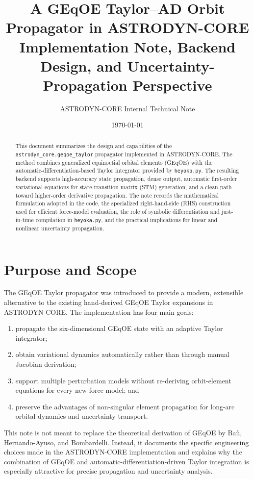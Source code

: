 \documentclass[11pt]{article}
\title{A GEqOE Taylor--AD Orbit Propagator in ASTRODYN-CORE\\
\large Implementation Note, Backend Design, and Uncertainty-Propagation Perspective}
\author{ASTRODYN-CORE Internal Technical Note}
\date{\today}
\begin{document}
\maketitle

\begin{abstract}
This document summarizes the design and capabilities of the
\texttt{astrodyn\_core.geqoe\_taylor} propagator implemented in ASTRODYN-CORE.
The method combines generalized equinoctial orbital elements (GEqOE) with the
automatic-differentiation-based Taylor integrator provided by \texttt{heyoka.py}.
The resulting backend supports high-accuracy state propagation, dense output,
automatic first-order variational equations for state transition matrix (STM)
generation, and a clean path toward higher-order derivative propagation.
The note records the mathematical formulation adopted in the code, the
specialized right-hand-side (RHS) construction used for efficient force-model
evaluation, the role of symbolic differentiation and just-in-time compilation in
\texttt{heyoka.py}, and the practical implications for linear and nonlinear
uncertainty propagation.
\end{abstract}

\section{Purpose and Scope}

The GEqOE Taylor propagator was introduced to provide a modern, extensible
alternative to the existing hand-derived GEqOE Taylor expansions in
ASTRODYN-CORE. The implementation has four main goals:
\begin{enumerate}
    \item propagate the six-dimensional GEqOE state with an adaptive Taylor
    integrator;
    \item obtain variational dynamics automatically rather than through manual
    Jacobian derivation;
    \item support multiple perturbation models without re-deriving
    orbit-element equations for every new force model; and
    \item preserve the advantages of non-singular element propagation for
    long-arc orbital dynamics and uncertainty transport.
\end{enumerate}

This note is not meant to replace the theoretical derivation of GEqOE by
Ba\`u, Hernando-Ayuso, and Bombardelli. Instead, it documents the specific
engineering choices made in the ASTRODYN-CORE implementation and explains why
the combination of GEqOE and automatic-differentiation-driven Taylor
integration is especially attractive for precise propagation and uncertainty
analysis.
\end{document}
